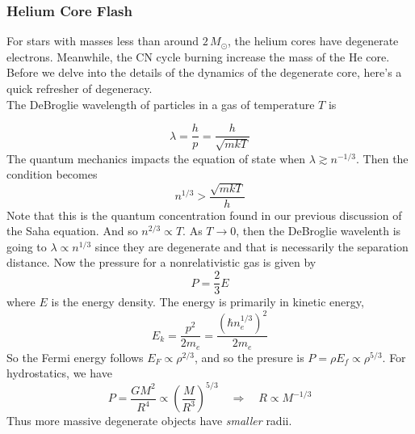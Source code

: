 \documentclass[10pt]{article}
\numberwithin{equation}{section}
\newcommand{\n}{\noindent}
\begin{document}
    \subsubsection{Helium Core Flash}
    \label{sec:helium-core-flash}

    For stars with masses less than around $2\,M_\odot$, the helium
    cores have degenerate electrons. Meanwhile, the CN cycle burning
    increase the mass of the He core. Before we delve into the details
    of the dynamics of the degenerate core, here's a quick refresher
    of degeneracy.\\

    \n The DeBroglie wavelength of particles in a gas of temperature
    $T$ is

    \begin{equation}
      \label{eq:277}
      \lambda=\frac{h}{p}=\frac{h}{\sqrt{mkT}}
    \end{equation}
    The quantum mechanics impacts the equation of state when $\lambda
    \gtrsim n^{-1/3}$. Then the condition becomes
    \begin{equation}
      \label{eq:278}
      n^{1/3}>\frac{\sqrt{mkT}}{h}
    \end{equation}
    Note that this is the quantum concentration found in our previous
    discussion of the Saha equation. And so $n^{2/3}\propto T$. As
    $T\to 0$, then the DeBroglie wavelenth is going to $\lambda\propto
    n^{1/3}$ since they are degenerate and that is necessarily the
    separation distance. Now the pressure for a nonrelativistic gas is
    given by
    \begin{equation}
      \label{eq:279}
      P=\frac{2}{3}E
    \end{equation}
    where $E$ is the energy density. The energy is primarily in
    kinetic energy,
    \begin{equation}
      \label{eq:280}
      E_k=\frac{p^2}{2m_e}=\frac{(\hbar n_e^{1/3})^2}{2m_e}
    \end{equation}
    So the Fermi energy follows $E_F\propto \rho^{2/3}$, and so the
    presure is $P=\rho E_f\propto \rho^{5/3}$. For hydrostatics, we
    have
    \begin{equation}
      \label{eq:281}
      P=\frac{GM^2}{R^4}\propto
      \left(\frac{M}{R^3}\right)^{5/3}\quad\Rightarrow \quad R\propto M^{-1/3}
    \end{equation} 
    Thus more massive degenerate objects have \emph{smaller}
    radii.\\   
  
\end{document}
